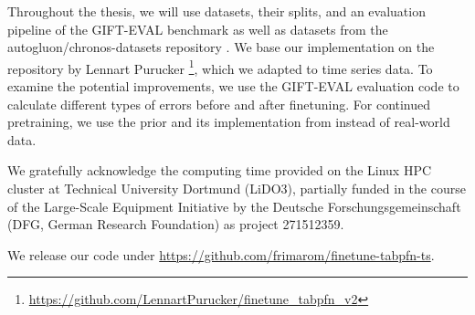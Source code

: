 Throughout the thesis, we will use datasets, their splits, and an evaluation pipeline of the GIFT-EVAL benchmark as well as datasets from the autogluon/chronos-datasets repository \citep{aksu2024giftevalbenchmarkgeneraltime,ansari2024chronos} .
We base our implementation on the repository by Lennart Purucker \footnote{\url{https://github.com/LennartPurucker/finetune_tabpfn_v2}}, which we adapted to time series data.
To examine the potential improvements, we use the GIFT-EVAL evaluation code to calculate different types of errors before and after finetuning.
\newline
For continued pretraining, we use the prior and its implementation from \citet{dooley2023forecastpfn} instead of real-world data.

We gratefully acknowledge the computing time provided on the Linux HPC cluster at Technical University Dortmund (LiDO3), partially funded in the course of the Large-Scale Equipment Initiative by the Deutsche Forschungsgemeinschaft (DFG, German Research Foundation) as project 271512359.

We release our code under \url{https://github.com/frimarom/finetune-tabpfn-ts}.